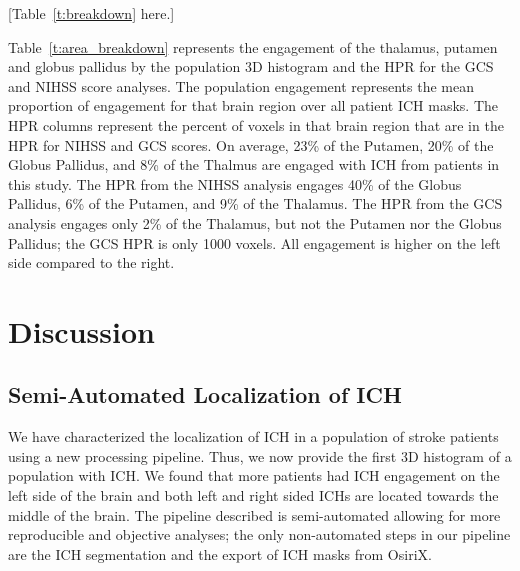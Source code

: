 \documentclass[10pt]{article}\usepackage[]{graphicx}\usepackage[]{color}
\begin{document}
[Table~\ref{t:breakdown} here.]

Table~\ref{t:area_breakdown} represents the engagement of the thalamus, putamen and globus pallidus by the population 3D histogram and the HPR for the GCS and NIHSS score analyses.  The population engagement represents the mean proportion of engagement for that brain region over all patient ICH masks. The HPR columns represent the percent of voxels in that brain region that are in the HPR for NIHSS and GCS scores. On average, 23\% of the Putamen, 20\% of the Globus Pallidus, and 8\% of the Thalmus are engaged with ICH from patients in this study. The HPR from the NIHSS analysis engages 40\% of the Globus Pallidus, 6\% of the Putamen, and 9\% of the Thalamus. The HPR from the GCS analysis engages only 2\% of the Thalamus, but not the Putamen nor the Globus Pallidus; the GCS HPR is only 1000 voxels. All engagement is higher on the left side compared to the right. 


\section{Discussion}


\subsection{Semi-Automated Localization of ICH}

We have characterized the localization of ICH in a population of stroke patients using a new processing pipeline.  Thus, we now provide the first 3D histogram of a population with ICH.  We found that more patients had ICH engagement on the left side of the brain and both left and right sided ICHs are located towards the middle of the brain.  
The pipeline described is semi-automated allowing for more reproducible and objective analyses; the only non-automated steps in our pipeline are the ICH segmentation and the export of ICH masks from OsiriX.  


 


\end{document}
